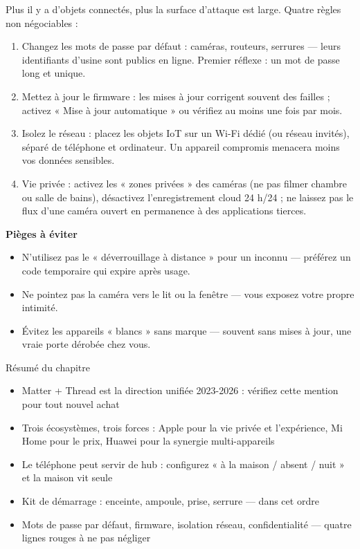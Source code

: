 
Plus il y a d'objets connectés, plus la surface d'attaque est large. Quatre règles non négociables :

\begin{enumerate}
  \item Changez les mots de passe par défaut : caméras, routeurs, serrures — leurs identifiants d'usine sont publics en ligne. Premier réflexe : un mot de passe long et unique.
  \item Mettez à jour le firmware : les mises à jour corrigent souvent des failles ; activez « Mise à jour automatique » ou vérifiez au moins une fois par mois.
  \item Isolez le réseau : placez les objets IoT sur un Wi-Fi dédié (ou réseau invités), séparé de téléphone et ordinateur. Un appareil compromis menacera moins vos données sensibles.
  \item Vie privée : activez les « zones privées » des caméras (ne pas filmer chambre ou salle de bains), désactivez l'enregistrement cloud 24 h/24 ; ne laissez pas le flux d'une caméra ouvert en permanence à des applications tierces.
\end{enumerate}

\textbf{Pièges à éviter}\par

\begin{itemize}
  \item N'utilisez pas le « déverrouillage à distance » pour un inconnu — préférez un code temporaire qui expire après usage.
  \item Ne pointez pas la caméra vers le lit ou la fenêtre — vous exposez votre propre intimité.
  \item Évitez les appareils « blancs » sans marque — souvent sans mises à jour, une vraie porte dérobée chez vous.
\end{itemize}

\begin{tcbsummary}{Résumé du chapitre}
\begin{itemize}
  \item Matter + Thread est la direction unifiée 2023-2026 : vérifiez cette mention pour tout nouvel achat
  \item Trois écosystèmes, trois forces : Apple pour la vie privée et l'expérience, Mi Home pour le prix, Huawei pour la synergie multi-appareils
  \item Le téléphone peut servir de hub : configurez « à la maison / absent / nuit » et la maison vit seule
  \item Kit de démarrage : enceinte, ampoule, prise, serrure — dans cet ordre
  \item Mots de passe par défaut, firmware, isolation réseau, confidentialité — quatre lignes rouges à ne pas négliger
\end{itemize}

\end{tcbsummary}

